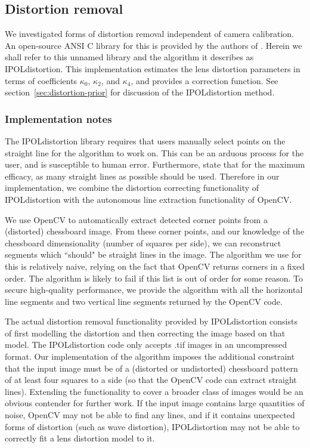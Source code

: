 
\subsection{Distortion removal}
\label{sec:distortion}

We investigated forms of distortion removal independent of camera calibration. An open-source ANSI C library for this is provided by the authors of \cite{algebraic-distortion}. Herein we shall refer to this unnamed library and the algorithm it describes as IPOLdistortion. This implementation estimates the lens distortion parameters in terms of coefficients $\kappa_{0}$, $\kappa_{2}$, and $\kappa_{4}$, and provides a correction function. See section~\ref{sec:distortion-prior} for discussion of the IPOLdistortion method.

\subsubsection{Implementation notes}

The IPOLdistortion library requires that users manually select points on the straight line for the algorithm to work on. This can be an arduous process for the user, and is susceptible to human error. Furthermore, \cite{algebraic-distortion} state that for the maximum efficacy, as many straight lines as possible should be used. Therefore in our implementation, we combine the distortion correcting functionality of IPOLdistortion with the autonomous line extraction functionality of OpenCV. 

We use OpenCV to automatically extract detected corner points from a (distorted) chessboard image. From these corner points, and our knowledge of the chessboard dimensionality (number of squares per side), we can reconstruct segments which ``should" be straight lines in the image. The algorithm we use for this is relatively naive, relying on the fact that OpenCV returns corners in a fixed order. The algorithm is likely to fail if this list is out of order for some reason. To secure high-quality performance, we provide the algorithm with all the horizontal line segments and two vertical line segments returned by the OpenCV code.

The actual distortion removal functionality provided by IPOLdistortion consists of first modelling the distortion and then correcting the image based on that model. The IPOLdistortion code only accepts .tif images in an uncompressed format. Our implementation of the algorithm imposes the additional constraint that the input image must be of a (distorted or undistorted) chessboard pattern of at least four squares to a side (so that the OpenCV code can extract straight lines). Extending the functionality to cover a broader class of images would be an obvious contender for further work. If the input image contains large quantities of noise, OpenCV may not be able to find any lines, and if it contains unexpected forms of distortion (such as wave distortion), IPOLdistortion may not be able to correctly fit a lens distortion model to it.


